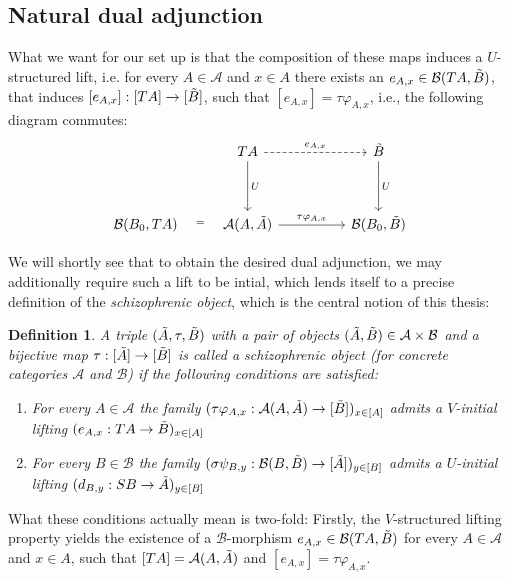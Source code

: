 \documentclass[12pt,a4paper]{article}
\newtheorem{definition}{Definition}[section] %
\def\HomA{\ensuremath\mathcal{A}}
\def\HomB{\ensuremath\mathcal{B}}
\def\t{\ensuremath\tilde}
\begin{document}
\subsection{Natural dual adjunction}
What we want for our set up is that the composition of these maps induces a $U$-structured lift, i.e. for every $A \in \mathcal{A}$ and  $x \in A$ there exists an $e_{A,x} \in \HomB(TA, \t B)$, that induces  $[e_{A,x}]: [TA] \to [\t B]$, such that $[e_{A,x}] = \tau \varphi_{A,x}$, i.e., the following diagram commutes: 
\[\begin{tikzcd}
	& TA && {\t B} \\
	\\
	{\HomB(B_0, TA)} & {\HomA(A, \t A)} && {\HomB(B_0, \t B)}
	\arrow["e_{A,x}",dashed, from=1-2, to=1-4]
	\arrow["U", from=1-2, to=3-2]
	\arrow["U", from=1-4, to=3-4]
	\arrow["{=}", shift right=1, draw=none, from=3-1, to=3-2]
	\arrow["{\tau \varphi_{A,x}}", from=3-2, to=3-4]
\end{tikzcd}\]

We will shortly see that to obtain the desired dual adjunction, we may additionally require such a lift to be intial, which lends itself to a precise definition of the \emph{schizophrenic object}, which is the central notion of this thesis:

\begin{definition}
	A triple $(\t A, \tau, \t B)$ with a pair of objects $(\t A, \t B) \in \mathcal{A} \times \mathcal{B}$ and a bijective map $\tau: [\t A] \to [\t B]$ is called a \emph{schizophrenic object} (for concrete categories $\mathcal{A}$ and $\mathcal{B}$) if the following conditions are satisfied:
\begin{enumerate}
		\item[SO1.] For every $A \in \mathcal{A}$ the family $(\tau\varphi_{A,x}: \HomA(A, \t A) \to [\t B])_{x \in [A]}$ admits a $V$-initial lifting $(e_{A,x}:TA \to \t B)_{x \in [A]}$
		\item[SO2.] For every $B \in \mathcal{B}$ the family $(\sigma\psi_{B,y}: \HomB(B, \t B) \to [\t A])_{y \in [B]}$ admits a $U$-initial lifting $(d_{B,y}:SB \to \t A)_{y \in [B]}$
	\end{enumerate}
\end{definition}

What these conditions actually mean is two-fold: Firstly, the $V$-structured lifting property yields the existence of  a $\mathcal{B}$-morphism $e_{A,x} \in \HomB(TA, \t B)$ for every $A \in \mathcal{A}$ and $x \in A$, such that $[TA] = \HomA(A, \t A)$ and $[e_{A,x}] = \tau \varphi_{A,x}$.
\end{document}
